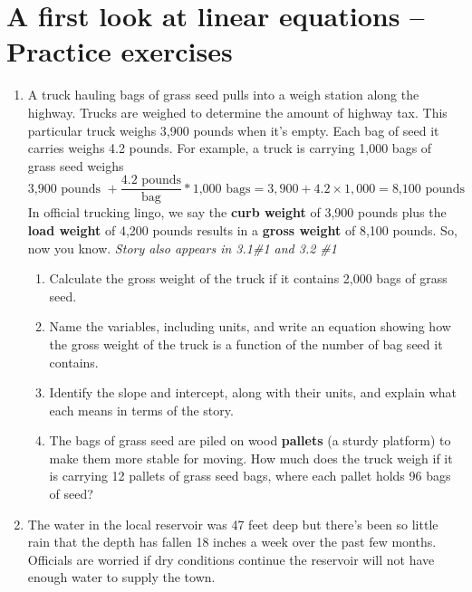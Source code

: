 \section{A first look at linear equations -- Practice exercises}

\begin{enumerate}

\item A truck hauling bags of grass seed pulls into a weigh station along the highway.  Trucks are weighed to determine the amount of highway tax.  This particular truck weighs 3,900 pounds when it's empty.  Each bag of seed it carries weighs 4.2 pounds. 
For example, a truck is carrying 1,000 bags of grass seed weighs 
$$\text{3,900 pounds } + \frac{4.2 \text{ pounds}}{\text{bag}} \ast \text{1,000  bags} = 3,900 + 4.2\times1,000=\text{8,100 pounds}$$ 
In official trucking lingo, we  say the \textbf{curb weight} of 3,900 pounds plus the \textbf{load weight} of 4,200 pounds results in a \textbf{gross weight} of 8,100 pounds.  So, now you know.  \hfill \emph{Story also appears in 3.1\#1 and 3.2 \#1}
\begin{enumerate}
\item Calculate the gross weight of the truck if it contains 2,000 bags of grass seed.   \vfill
\item Name the variables, including units, and  write an equation showing how the gross weight of the truck is a function of the number of bag seed it contains.  \vfill
\item Identify the slope and intercept, along with their units, and explain what each means in terms of the story. \vfill
\item The bags of grass seed are piled on wood \textbf{pallets} (a sturdy platform) to make them more stable for moving. How much does the truck weigh if it is carrying 12 pallets of grass seed bags, where each pallet holds 96 bags of seed?    \vfill
\end{enumerate}

\newpage %

\item The water in the local reservoir was 47 feet deep but there's been so little rain that the depth has fallen 18 inches a week over the past few months.  Officials are worried if dry conditions continue the reservoir will not have enough water to supply the town.  


\end{enumerate}

